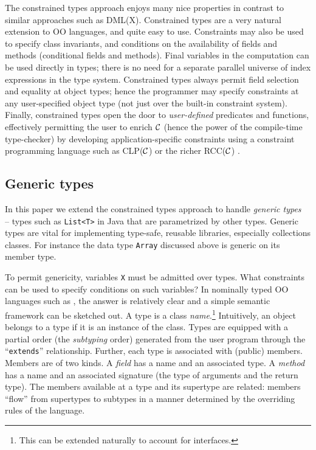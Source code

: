 The constrained types approach enjoys many nice properties in contrast
to similar approaches such as DML(X)\cite{xi99dependent}.  Constrained
types are a very natural extension to OO languages, and quite easy to
use. Constraints may also be used to specify class invariants, and
conditions on the availability of fields and methods (conditional
fields and methods).  Final variables in the computation can be used
directly in types; there is no need for a separate parallel universe
of index expressions in the type system.  Constrained types always
permit field selection and equality at object types; hence the
programmer may specify constraints at any user-specified object type
(not just over the built-in constraint system).  Finally, constrained
types open the door to {\em user-defined} predicates and functions,
effectively permitting the user to enrich $\cal C$ (hence the power of
the compile-time type-checker) by developing application-specific
constraints using a constraint programming language such as CLP($\cal
C$) \cite{clp} or the richer RCC($\cal C$) \cite{rc}.

\subsection{Generic types}

In this paper we extend the constrained types approach to handle {\em
generic
types}~\cite{clu,ada,GJ,java-popl97,thorup97,Java3,csharp-generics} --
types such as {\tt List<T>} in Java that are parametrized by other
types. Generic types are vital for implementing type-safe, reusable
libraries, especially collections classes. For instance the data type
{\tt Array} discussed above is generic on its member type.

To permit genericity, variables {\tt X} must be admitted over types.
What constraints can be used to specify conditions on such variables?
In nominally typed OO languages such as \Java, the answer is
relatively clear and a simple semantic framework can be sketched out.
A type is a class {\em name}.\footnote{This can be extended naturally
to account for interfaces.} Intuitively, an object belongs to a type
if it is an instance of the class. Types are equipped with a partial
order (the {\em subtyping} order) generated from the user program
through the ``{\tt extends}'' relationship.  Further, each type is
associated with (public) members. Members are of two kinds.  A {\em
field} has a name and an associated type. A {\em method} has a name
and an associated signature (the type of arguments and the return
type).  The members available at a type and its supertype are related:
members ``flow'' from supertypes to subtypes in a manner determined by
the overriding rules of the language.

